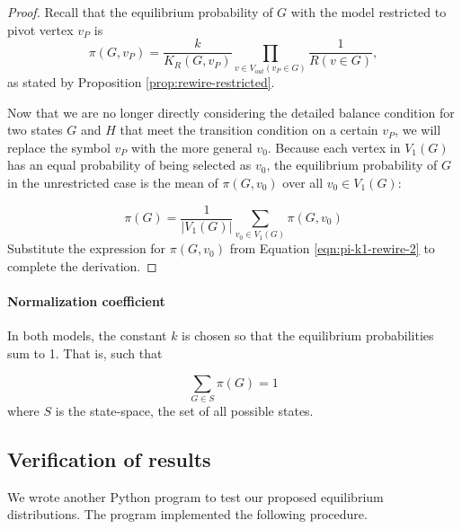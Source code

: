 \documentclass[a4paper,10pt]{article}
\begin{document}
\begin{proof}
Recall that the equilibrium probability of $G$ with the model restricted to pivot vertex $v_P$ is
 \begin{equation}
 \label{eqn:pi-k1-rewire-2}
  \pi(G, v_P) = \frac{k}{K_R(G, v_P)} 
 \prod \limits_{v \in V_{out}(v_P \in G)} \frac{1}{R(v \in G)},
 \end{equation}
as stated by Proposition \ref{prop:rewire-restricted}.

Now that we are no longer directly considering the detailed balance condition for two states $G$ and $H$ that meet the transition condition on a certain $v_P$, we will replace the symbol $v_P$ with the more general $v_0$. Because each vertex in $V_1(G)$ has an equal probability of being selected as $v_0$, the equilibrium probability of $G$ in the unrestricted case is the mean of $\pi(G, v_0)$ over all $v_0 \in V_1(G)$:

\begin{equation}
   \pi(G) = \frac{1}{|V_1(G)|} \sum\limits_{v_0 \in V_1(G)} 
 \pi(G, v_0)
\end{equation}
Substitute the expression for $\pi(G, v_0)$ from Equation \ref{eqn:pi-k1-rewire-2} to complete the derivation.

\end{proof}

\paragraph{Normalization coefficient}
In both models, the constant $k$ is chosen so that the equilibrium probabilities sum to 1. That is, such that

\begin{equation}
 \sum\limits_{G \in S} \pi(G) = 1
\end{equation}
where $S$ is the state-space, the set of all possible states.

\subsection{Verification of results}

We wrote another Python program to test our proposed equilibrium distributions. The program implemented the following procedure.
\end{document}
